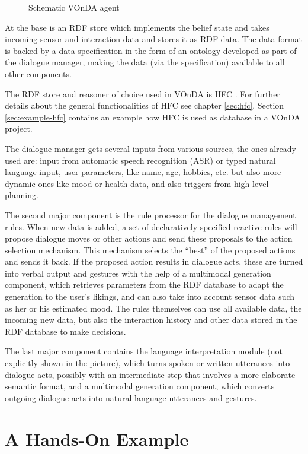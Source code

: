 \documentclass[a4paper]{report}
\newcommand{\vonda}{VOnDA\xspace}
\begin{document}
\begin{figure}[htb]

\caption{\label{fig:arch}Schematic \vonda agent}
\end{figure}

At the base is an RDF store which implements the belief state and takes
incoming sensor and interaction data and stores it as RDF data. The data format
is backed by a data specification in the form of an ontology developed as part
of the dialogue manager, making the data (via the specification) available to
all other components.

The RDF store and reasoner of choice used in \vonda is HFC
\citep{krieger2013efficient}. For further details about the general
functionalities of HFC see chapter \ref{sec:hfc}. Section \ref{sec:example-hfc}
contains an example how HFC is used as database in a \vonda project.

The dialogue manager gets several inputs from various sources, the ones already
used are: input from automatic speech recognition (ASR) or typed natural
language input, user parameters, like name, age, hobbies, etc. but also more
dynamic ones like mood or health data, and also triggers from high-level
planning.

The second major component is the rule processor for the dialogue management
rules. When new data is added, a set of declaratively specified reactive rules
will propose dialogue moves or other actions and send these proposals to the
action selection mechanism. This mechanism selects the ``best'' of the proposed
actions and sends it back. If the proposed action results in dialogue acts,
these are turned into verbal output and gestures with the help of a multimodal
generation component, which retrieves parameters from the RDF database to adapt
the generation to the user's likings, and can also take into account sensor
data such as her or his estimated mood. The rules themselves can use all
available data, the incoming new data, but also the interaction history and
other data stored in the RDF database to make decisions.

The last major component contains the language interpretation module (not
explicitly shown in the picture), which turns spoken or written utterances into
dialogue acts, possibly with an intermediate step that involves a more
elaborate semantic format, and a multimodal generation component, which
converts outgoing dialogue acts into natural language utterances and gestures.

\chapter{A Hands-On Example}

\end{document}
